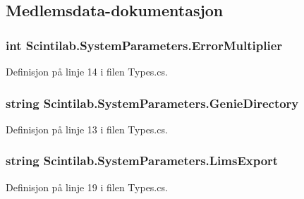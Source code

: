 \subsection{Medlemsdata-\/dokumentasjon}
\hypertarget{class_scintilab_1_1_system_parameters_a48f4d463357d03dc6cfa679b79320152}{
\subsubsection[{Error\+Multiplier}]{\setlength{\rightskip}{0pt plus 5cm}int Scintilab.\+System\+Parameters.\+Error\+Multiplier}}\label{class_scintilab_1_1_system_parameters_a48f4d463357d03dc6cfa679b79320152}


Definisjon på linje 14 i filen Types.\+cs.

\hypertarget{class_scintilab_1_1_system_parameters_a0a5d782455fab30269e4cd8263f89e99}{
\subsubsection[{Genie\+Directory}]{\setlength{\rightskip}{0pt plus 5cm}string Scintilab.\+System\+Parameters.\+Genie\+Directory}}\label{class_scintilab_1_1_system_parameters_a0a5d782455fab30269e4cd8263f89e99}


Definisjon på linje 13 i filen Types.\+cs.

\hypertarget{class_scintilab_1_1_system_parameters_a4a64c36d148176a1aafff5ee448e4bfd}{
\subsubsection[{Lims\+Export}]{\setlength{\rightskip}{0pt plus 5cm}string Scintilab.\+System\+Parameters.\+Lims\+Export}}\label{class_scintilab_1_1_system_parameters_a4a64c36d148176a1aafff5ee448e4bfd}


Definisjon på linje 19 i filen Types.\+cs.


